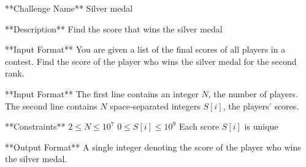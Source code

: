 **Challenge Name**  
Silver medal

**Description**  
Find the score that wins the silver medal

**Input Format**  
You are given a list of the final scores of all players in a contest. Find the score of the player who wins the silver medal for the second rank.

**Input Format**  
The first line contains an integer $N$, the number of players.  
The second line contains $N$ space-separated integers $S[i]$, the players' scores.

**Constraints**  
$2 \leq N \leq 10^7$  
$0 \leq S[i] \leq 10^{9}$  
Each score $S[i]$ is unique

**Output Format**  
A single integer denoting the score of the player who wins the silver medal.